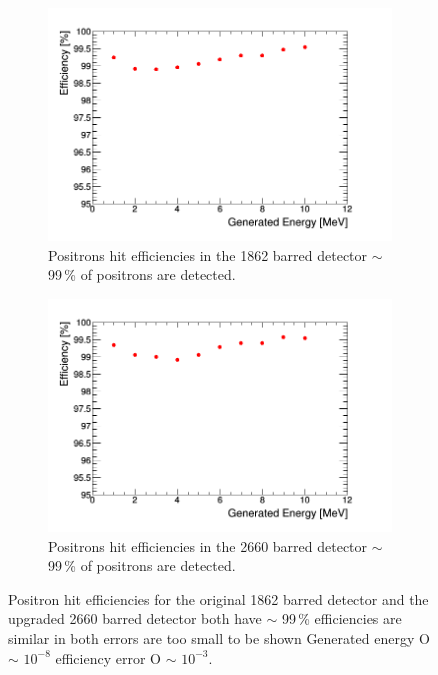 \documentclass[12pt,a4paper]{article}
\begin{document}
\begin{figure}[H]
\centering
\begin{subfigure}{.5\textwidth}
  \centering
  \includegraphics[width=\linewidth]{2000_1-10MeV_sec_p_spread_run.png}
  \captionsetup{width=.9\linewidth}
  \caption{Positrons hit efficiencies in the 1862 barred detector $\sim$ 99\,\% of positrons are detected.}
  \label{2000_p_sec}
\end{subfigure}%
\begin{subfigure}{.5\textwidth}
  \centering
  \includegraphics[width=\linewidth]{3000_1-10MeV_sec_p_spread_run.png}
  \captionsetup{width=.9\linewidth}
  \caption{Positrons hit efficiencies in the 2660 barred detector $\sim$ 99\,\% of positrons are detected.}
  \label{3000_p_sec}
\end{subfigure}
\caption{Positron hit efficiencies for the original 1862 barred detector and the upgraded 2660 barred detector both have $\sim$ 99\,\% efficiencies are similar in both errors are too small to be shown Generated energy O $\sim$ $10^{-8}$ efficiency error O $\sim$ $10^{-3}$.}
\label{2000_3000_p_secs}
\end{figure}
\end{document}

